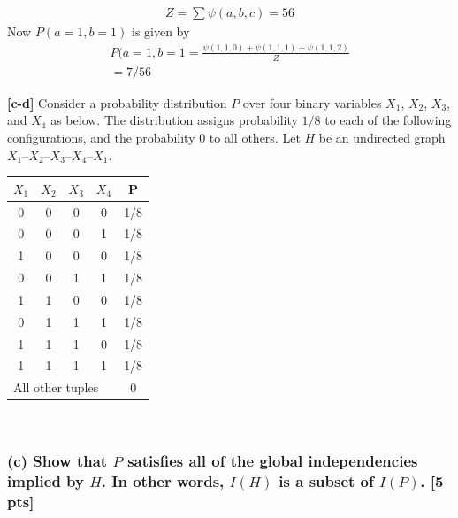 \documentclass[twoside,11pt]{article}\usepackage{amsmath,amsfonts,amsthm,fullpage}
\begin{document}
\begin{equation}
\begin{split}
Z = \sum \psi(a,b,c) =56
\end{split}
\end{equation}
Now $P(a = 1,b = 1)$ is given by
\begin{equation}
\begin{split}
P(a = 1,b = 1 = \frac{\psi(1,1,0) + \psi(1,1,1)+ \psi(1,1,2)}{Z}\\
=7/56
\end{split}
\end{equation}

\iffalse
\textbf{[c-d]} Consider a probability distribution $P$ over four
binary variables $X_1$, $X_2$, $X_3$, and $X_4$ as below. The
distribution assigns probability $1/8$ to each of the following
configurations, and the probability 0 to all others. Let $H$ be an
undirected graph $X_1$--$X_2$--$X_3$--$X_4$--$X_1$.

\begin{table}[!h]
     \centering
    \begin{tabular}{cccc|c}
    \hline
    $X_1$ & $X_2$ & $X_3$   & $X_4$ & P   \\ \hline
    0     & 0     & 0       & 0     & 1/8 \\
    0     & 0     & 0       & 1     & 1/8 \\
    1     & 0     & 0       & 0     & 1/8 \\
    0     & 0     & 1       & 1     & 1/8 \\
    1     & 1     & 0       & 0     & 1/8 \\
    0     & 1     & 1       & 1     & 1/8 \\
    1     & 1     & 1       & 0     & 1/8 \\
    1     & 1     & 1       & 1     & 1/8 \\ \hline
    \multicolumn{4}{l|}{All other tuples}  & 0   \\ \hline
    \end{tabular}
\end{table}
\noindent

~\\
\subsubsection*{(c) Show that $P$ satisfies all of the global independencies implied by $H$. In other words, $I(H)$ is a subset of $I(P)$. [5 pts]}
\end{document}
